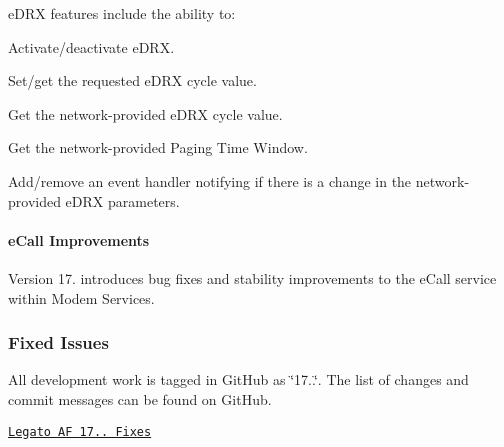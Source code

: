 e\+D\+RX features include the ability to\+:
\begin{DoxyItemize}
\item Activate/deactivate e\+D\+RX.
\item Set/get the requested e\+D\+RX cycle value.
\item Get the network-\/provided e\+D\+RX cycle value.
\item Get the network-\/provided Paging Time Window.
\item Add/remove an event handler notifying if there is a change in the network-\/provided e\+D\+RX parameters.
\end{DoxyItemize}\hypertarget{releaseNotes17110_rn1711_Features_eCall}{}\paragraph{e\+Call Improvements}\label{releaseNotes17110_rn1711_Features_eCall}
Version 17. introduces bug fixes and stability improvements to the e\+Call service within Modem Services.\hypertarget{releaseNotes17110_rn1711_Fixes}{}\subsubsection{Fixed Issues}\label{releaseNotes17110_rn1711_Fixes}
All development work is tagged in Git\+Hub as \char`\"{}17..\char`\"{}. The list of changes and commit messages can be found on Git\+Hub.


\begin{DoxyItemize}
\item \href{https://github.com/legatoproject/legato-af/commits/17.11.0}{\tt Legato AF 17.. Fixes}
\end{DoxyItemize}

